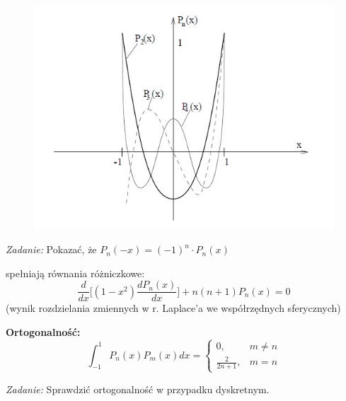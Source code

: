 \begin{frame}
	\begin{figure}
		\includegraphics[height=0.82\textheight]{img/5/img2.jpg}
	\end{figure}
\end{frame}
\begin{frame}
	\begin{flushright}
    	\textit{Zadanie:} \quad Pokazać, że $P_n(-x) = (-1)^n \cdot P_n(x)$ 
    \end{flushright}
	spełniają równania różniczkowe:
        $$\frac{d}{dx}\bigg[(1-x^2)\frac{dP_n(x)}{dx}\bigg]+n(n+1)P_n(x) = 0$$
        (wynik rozdzielania zmiennych w r. Laplace'a we współrzędnych sferycznych) \newline \par
        \textbf{Ortogonalność: }
        $$\int_{-1}^{1}P_n(x)P_m(x)dx = \left\{\begin{array}{cc}
        0, & m \not= n \\
        \frac{2}{2n+1}, & m = n 
        \end{array}\right.$$
        \begin{flushright}
        	\textit{Zadanie: } \quad Sprawdzić ortogonalność w przypadku dyskretnym.
        \end{flushright}
\end{frame}
